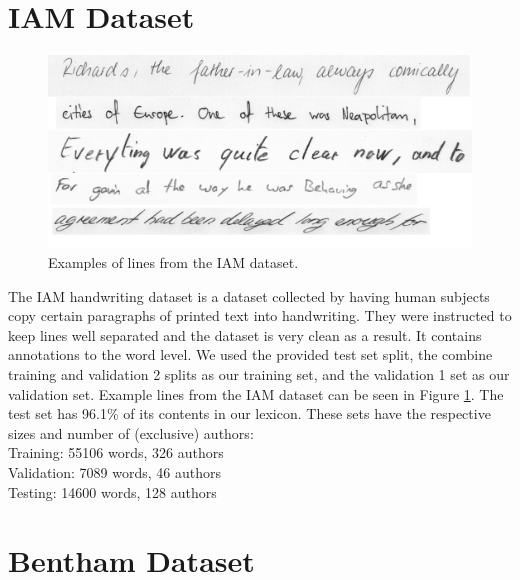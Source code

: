 \documentclass[ms,electronic,twosidetoc,letterpaper,chaptercenter,parttop,lof,lot]{byumsphd}
\begin{document}
\section{IAM Dataset}

\begin{figure}
    \centering
    \includegraphics[width=.9\textwidth]{IAM_examples}
    \caption{Examples of lines from the IAM dataset.}
    \label{fig:IAMExamples}
\end{figure}

The IAM handwriting dataset \cite{IAM} is a dataset collected by having human subjects copy certain paragraphs of printed text into handwriting. They were instructed to keep lines well separated and the dataset is very clean as a result. It contains annotations to the word level. We used the provided test set split, the combine training and validation 2 splits as our training set, and the validation 1 set as our validation set.
Example lines from the IAM dataset can be seen in Figure \ref{fig:IAMExamples}.
The test set has 96.1\% of its contents in our lexicon.
These sets have the respective sizes and number of (exclusive) authors:\\
\indent \indent Training: 55106 words, 326 authors\\
\indent \indent Validation: 7089 words, 46 authors\\
\indent \indent Testing: 14600 words, 128 authors



\section{Bentham Dataset}
\end{document}
